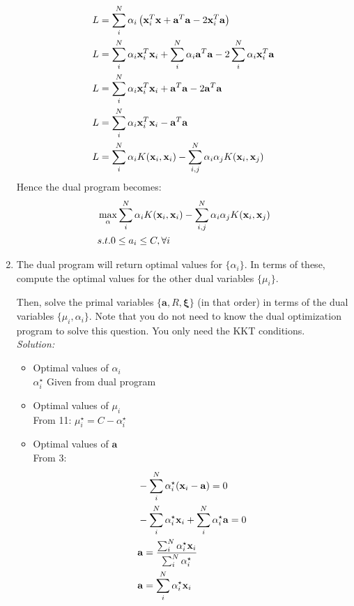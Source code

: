 \documentclass[12pt,a4paper]{article}
\newcommand{\lp}{\left(}
\newcommand{\rp}{\right)}
\newcommand{\xscalar}{x}
\newcommand{\xvec}{{\bf \xscalar}}
\newcommand{\avec}{\mathbf{a}}
\begin{document}
\begin{enumerate}
			\begin{align*}
			L &= \sum_i^N \alpha_i \lp \xvec_i^T\xvec + \avec^T\avec - 2\xvec_i^T \avec \rp \\
			L &= \sum_i^N \alpha_i \xvec_i^T\xvec_i + 
			\sum_i^N \alpha_i  \avec^T\avec -2 \sum_i^N \alpha_i \xvec_i^T \avec \\
			L &= \sum_i^N \alpha_i \xvec_i^T\xvec_i + \avec^T\avec -2 \avec^T \avec \\
			L &= \sum_i^N \alpha_i \xvec_i^T\xvec_i - \avec^T\avec \\
			L &= \sum_i^N \alpha_i K(\xvec_i, \xvec_i) -  \sum_{i,j}^N \alpha_i \alpha_j K(\xvec_i, \xvec_j)  \\
			\end{align*}
		Hence the dual program becomes:
			\begin{align*}
			&\max_{\alpha} \sum_i^N \alpha_i K(\xvec_i, \xvec_i) -  \sum_{i,j}^N \alpha_i \alpha_j K(\xvec_i, \xvec_j) \\
			& s.t.  0 \leq a_i \leq C, \forall i
			\end{align*}
	
\item The dual program will return optimal values for $\{\alpha_i\}$. In terms of these, compute the optimal values for the other dual variables $\{\mu_i\}$.

Then, solve the primal variables $\{\boldsymbol{a},R,\boldsymbol{\xi} \}$ (in that order) in terms of the dual variables $\{\mu_i,\alpha_i\}$. Note that you do not need to know the dual optimization program to solve this question. You only need the KKT conditions.  \\
	\emph{Solution:} \\
		\begin{itemize}
			\item Optimal values of $\alpha_i$ \\
				$\alpha_i^\star$ Given from dual program
			
			\item Optimal values of $\mu_i$ \\
				From 11: $\mu_i^\star = C - \alpha_i^\star $
			
			\item Optimal values of $\avec$ \\
				From 3: 
				\begin{align*}
				& - \sum_i^N \alpha_i^\star ( \xvec_i - \avec ) = 0 \\
				& - \sum_i^N \alpha_i^\star \xvec_i + \sum_i^N \alpha_i^\star \avec  = 0 \\
				&\avec = \frac{\sum_i^N \alpha_i^\star \xvec_i}{\sum_i^N \alpha_i^\star} \\
				&\avec = \sum_i^N \alpha_i^\star \xvec_i
				\end{align*}
			

\end{itemize}
\end{enumerate}
\end{document}
